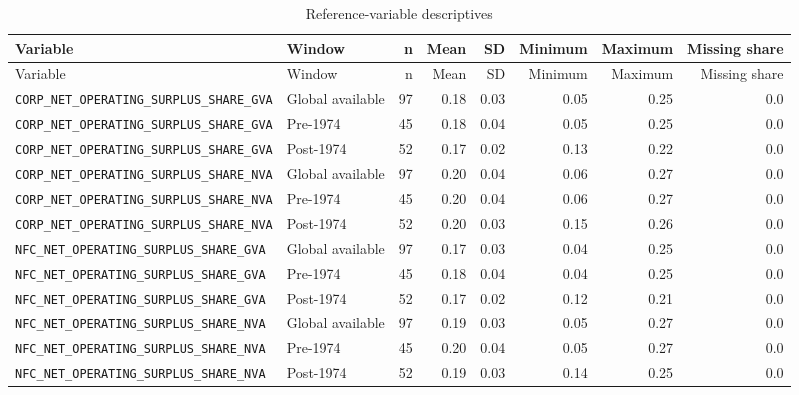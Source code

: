 \begin{landscape}
\begin{longtable}{p{4.4cm}p{3.8cm}rrrrrr}
\caption{Reference-variable descriptives}\\
\toprule
Variable & Window & n & Mean & SD & Minimum & Maximum & Missing share\\
\midrule
\endfirsthead
\toprule
Variable & Window & n & Mean & SD & Minimum & Maximum & Missing share\\
\midrule
\endhead
\nolinkurl{CORP_NET_OPERATING_SURPLUS_SHARE_GVA} & Global available & 97 & 0.18 & 0.03 & 0.05 & 0.25 & 0.0
\\
\nolinkurl{CORP_NET_OPERATING_SURPLUS_SHARE_GVA} & Pre-1974 & 45 & 0.18 & 0.04 & 0.05 & 0.25 & 0.0
\\
\nolinkurl{CORP_NET_OPERATING_SURPLUS_SHARE_GVA} & Post-1974 & 52 & 0.17 & 0.02 & 0.13 & 0.22 & 0.0
\\
\nolinkurl{CORP_NET_OPERATING_SURPLUS_SHARE_NVA} & Global available & 97 & 0.20 & 0.04 & 0.06 & 0.27 & 0.0
\\
\nolinkurl{CORP_NET_OPERATING_SURPLUS_SHARE_NVA} & Pre-1974 & 45 & 0.20 & 0.04 & 0.06 & 0.27 & 0.0
\\
\nolinkurl{CORP_NET_OPERATING_SURPLUS_SHARE_NVA} & Post-1974 & 52 & 0.20 & 0.03 & 0.15 & 0.26 & 0.0
\\
\nolinkurl{NFC_NET_OPERATING_SURPLUS_SHARE_GVA} & Global available & 97 & 0.17 & 0.03 & 0.04 & 0.25 & 0.0
\\
\nolinkurl{NFC_NET_OPERATING_SURPLUS_SHARE_GVA} & Pre-1974 & 45 & 0.18 & 0.04 & 0.04 & 0.25 & 0.0
\\
\nolinkurl{NFC_NET_OPERATING_SURPLUS_SHARE_GVA} & Post-1974 & 52 & 0.17 & 0.02 & 0.12 & 0.21 & 0.0
\\
\nolinkurl{NFC_NET_OPERATING_SURPLUS_SHARE_NVA} & Global available & 97 & 0.19 & 0.03 & 0.05 & 0.27 & 0.0
\\
\nolinkurl{NFC_NET_OPERATING_SURPLUS_SHARE_NVA} & Pre-1974 & 45 & 0.20 & 0.04 & 0.05 & 0.27 & 0.0
\\
\nolinkurl{NFC_NET_OPERATING_SURPLUS_SHARE_NVA} & Post-1974 & 52 & 0.19 & 0.03 & 0.14 & 0.25 & 0.0
\\
\bottomrule
\end{longtable}
\end{landscape}
